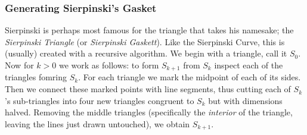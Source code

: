 \documentclass[11pt,oneside,final]{article}
\begin{document}
\subsubsection{Generating Sierpinski's Gasket}
Sierpinski is perhaps most famous for the triangle that takes his namesake; the
{\em Sierpinski Triangle} (or {\em Sierpinski Gaskett}). Like the Sierpinski
Curve, this is (usually) created with a recursive algorithm. We begin with a
triangle, call it \(S_0\). Now for \(k > 0\) we work as follows: to form
\(S_{k+1}\) from \(S_k\) inspect each of the triangles fomring \(S_k\). For
each triangle we mark the midpoint of each of its sides. Then we connect these
marked points with line segments, thus cutting each of \(S_k\)'s sub-triangles
into four new triangles congruent to \(S_k\) but with dimensions halved.
Removing the middle triangles (specifically the {\em interior} of the triangle,
leaving the lines just drawn untouched), we obtain \(S_{k+1}\).\\
\end{document}
